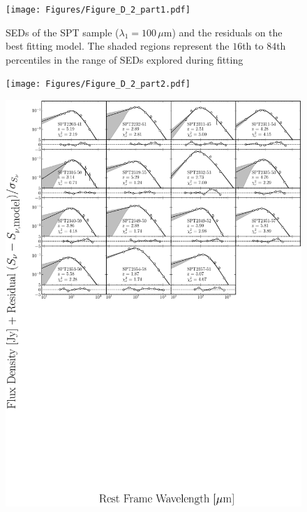 \begin{figure}
	\centering
	\caption[SEDs of SPT sample ($\lambda_1 = 100\,\mu$m)]{SEDs of the SPT sample ($\lambda_1 = 100\,\mu$m) and the residuals on the best fitting model. The shaded regions represent the $16$th to $84$th percentiles in the range of SEDs explored during fitting}
	\texttt{[image: Figures/Figure\_D\_2\_part1.pdf]}
\end{figure}
\begin{figure}
	\centering
	\texttt{[image: Figures/Figure\_D\_2\_part2.pdf]}
\end{figure}
\begin{figure}
	\centering
	\includegraphics[width=\columnwidth]{Figures/Figure_D_2_part3.pdf}
\end{figure}


